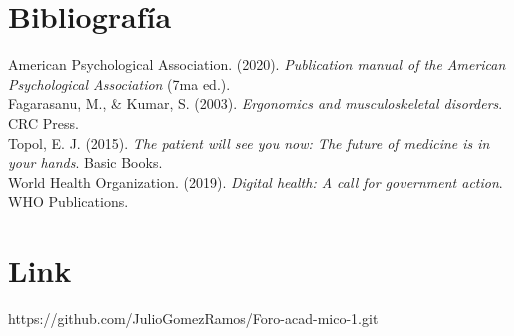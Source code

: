 \documentclass[12pt]{article}
\begin{document}
\section*{Bibliografía}
American Psychological Association. (2020). \textit{Publication manual of the American Psychological Association} (7ma ed.).\\
Fagarasanu, M., & Kumar, S. (2003). \textit{Ergonomics and musculoskeletal disorders}. CRC Press.\\
Topol, E. J. (2015). \textit{The patient will see you now: The future of medicine is in your hands}. Basic Books.\\
World Health Organization. (2019). \textit{Digital health: A call for government action}. WHO Publications.

\section*{Link} 
https://github.com/JulioGomezRamos/Foro-acad-mico-1.git
\end{document}
